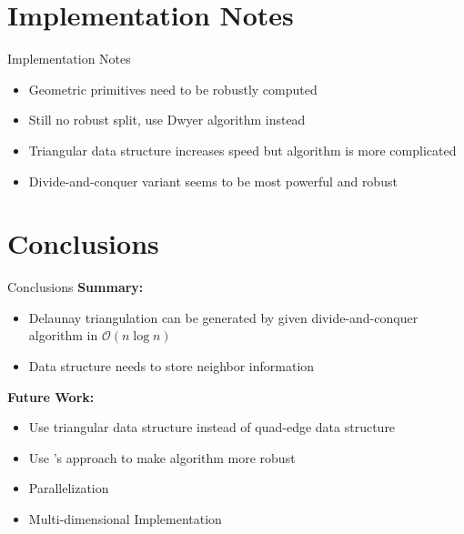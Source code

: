 \documentclass[aspectratio=169,fleqn]{beamer}
\begin{document}
\section{Implementation Notes}
  \begin{frame}{Implementation Notes}
    \begin{itemize}
      \item<+-> Geometric primitives need to be robustly computed
      \item<+-> Still no robust split, use Dwyer algorithm instead %
      \item<+-> Triangular data structure increases speed but algorithm is more complicated
      \item<+-> Divide-and-conquer variant seems to be most powerful and robust
    \end{itemize}
  \end{frame}


\section{Conclusions}
  \begin{frame}{Conclusions}
    \onslide<+->
    \textbf{Summary:}
    \begin{itemize}
      \item<+-> Delaunay triangulation can be generated by given divide-and-conquer algorithm in $\mathscr{O}(n\log n)$
      \item<+-> Data structure needs to store neighbor information
    \end{itemize}
    \bigskip
    \onslide<+->
    \textbf{Future Work:}
    \begin{itemize}
      \item<+-> Use triangular data structure instead of quad-edge data structure
      \item<+-> Use \citeauthor{dwyer1987}'s approach to make algorithm more robust
      \item<+-> Parallelization
      \item<+-> Multi-dimensional Implementation
    \end{itemize}
  \end{frame}


\setcounter{backupcounter}{\value{framenumber}}
\end{document}
